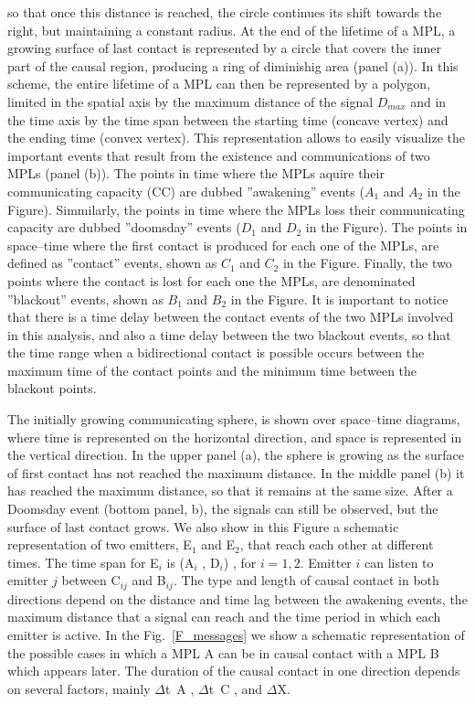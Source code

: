 so that once this distance is reached, the circle continues its shift
towards the right, but maintaining a constant radius.
%
At the end of the lifetime of a MPL, a growing surface of last
contact is represented by a circle that covers the inner part of the
causal region, producing a ring of diminishig area (panel (a)).
%
In this scheme, the entire lifetime of a MPL can then be represented
by a polygon, limited in the spatial axis by the maximum distance of
the signal $D_{max}$ and in the time axis by the time span between the
starting time (concave vertex) and the ending time (convex vertex).
%
This representation allows to easily visualize the important events
that result from the existence and communications of two MPLs (panel
(b)).
%
The points in time where the MPLs aquire their communicating capacity
(CC) are dubbed ''awakening'' events ($A_1$ and $A_2$ in the Figure).
%
Simmilarly, the points in time where the MPLs loss their
communicating capacity are dubbed ''doomsday'' events ($D_1$ and $D_2$
in the Figure).
%
The points in space--time where the first contact is produced for each
one of the MPLs, are defined as ''contact'' events, shown as $C_1$
and $C_2$ in the Figure.
%
Finally, the two points where the contact is lost for each one the
MPLs, are denominated ''blackout'' events, shown as $B_1$ and $B_2$
in the Figure.
%
It is important to notice that there is a time delay between the
contact events of the two MPLs involved in this analysis, and also a
time delay between the two blackout events, so that the time range
when a bidirectional contact is possible occurs between the maximum
time of the contact points and the minimum time between the blackout
points.




The initially growing communicating sphere, is shown over
space--time diagrams, where time is represented on the horizontal
direction, and space is represented in the vertical direction.
%
In the upper panel (a), the sphere is growing as the surface of first
contact has not reached the maximum distance.
%
In the middle panel (b) it has reached the maximum distance, so that
it remains at the same size.
%
After a Doomsday event (bottom panel, b), the signals can still be
observed, but the surface of last contact grows.
%
We also show in this Figure a schematic representation of two
emitters, E$_1$ and E$_2$, that reach each other at different times.
%
The time span for E$_i$ is (A$_i$ , D$_i$) , for $i = {1, 2}$.
%
Emitter $i$ can listen to emitter $j$ between C$_{ij}$ and B$_{ij}$.
%
The type and length of causal contact in both directions depend on the
distance and time lag between the awakening events, the maximum
distance that a signal can reach and the time period in which each
emitter is active.
%
In the Fig.~\ref{F_messages} we show a schematic representation of the
possible cases in which a MPL A can be in causal contact with a MPL
B which appears later.
%
The duration of the causal contact in one direction depends on several
factors, mainly $\Delta$t~A , $\Delta$t~C , and $\Delta$X.

